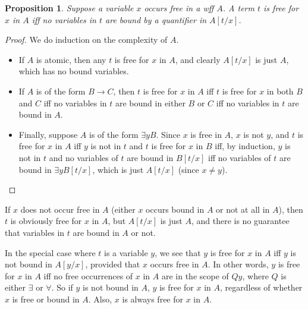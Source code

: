 \documentclass[12pt]{article}
\newtheorem{prop}{Proposition}
\begin{document}
\begin{prop} Suppose a variable $x$ occurs free in a wff $A$.  A term $t$ is free for $x$ in $A$ iff no variables in $t$ are bound by a quantifier in $A[t/x]$. \end{prop}
\begin{proof} We do induction on the complexity of $A$.  
\begin{itemize}
\item If $A$ is atomic, then any $t$ is free for $x$ in $A$, and clearly $A[t/x]$ is just $A$, which has no bound variables.  
\item If $A$ is of the form $B\to C$, then $t$ is free for $x$ in $A$ iff $t$ is free for $x$ in both $B$ and $C$ iff no variables in $t$ are bound in either $B$ or $C$ iff no variables in $t$ are bound in $A$.  
\item Finally, suppose $A$ is of the form $\exists y B$.  Since $x$ is free in $A$, $x$ is not $y$, and $t$ is free for $x$ in $A$ iff $y$ is not in $t$ and $t$ is free for $x$ in $B$ iff, by induction, $y$ is not in $t$ and no variables of $t$ are bound in $B[t/x]$ iff no variables of $t$ are bound in $\exists y B[t/x]$, which is just $A[t/x]$ (since $x\ne y$).
\end{itemize}
\end{proof}
If $x$ does not occur free in $A$ (either $x$ occurs bound in $A$ or not at all in $A$), then $t$ is obviously free for $x$ in $A$, but $A[t/x]$ is just $A$, and there is no guarantee that variables in $t$ are bound in $A$ or not.

In the special case where $t$ is a variable $y$, we see that $y$ is free for $x$ in $A$ iff $y$ is not bound in $A[y/x]$, provided that $x$ occurs free in $A$.  In other words, $y$ is free for $x$ in $A$ iff no free occurrences of $x$ in $A$ are in the scope of $Qy$, where $Q$ is either $\exists$ or $\forall$.  So if $y$ is not bound in $A$, $y$ is free for $x$ in $A$, regardless of whether $x$ is free or bound in $A$.  Also, $x$ is always free for $x$ in $A$.

\end{document}
